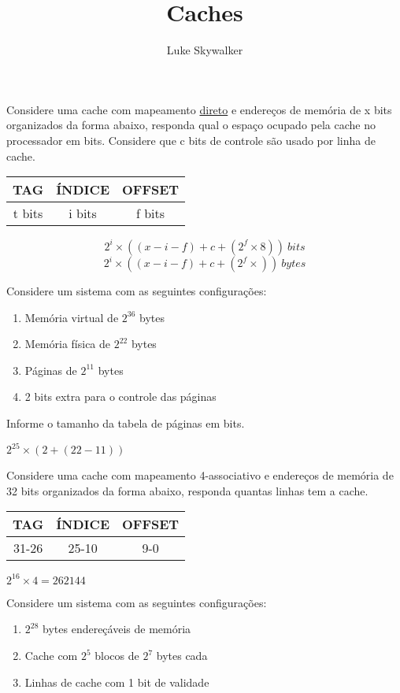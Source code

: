 \documentclass{article}
\author{Luke Skywalker}
\title{Caches}
\begin{document}
\maketitle

Considere uma cache com mapeamento \underline{direto} e endereços de memória de
x bits organizados da forma abaixo, responda qual o espaço ocupado pela cache no
processador em bits. Considere que c bits de controle são usado por linha de
cache.

\begin{table}[ht!]
  \centering
  \begin{tabular}{|c|c|c|}
    \hline TAG & ÍNDICE & OFFSET \\
    \hline t bits & i bits & f bits \\
    \hline
  \end{tabular}
\end{table}

$$2^{i}\times((x-i-f)+c+(2^{f} \times 8))\ bits$$
$$2^{i}\times((x-i-f)+c+(2^{f} \times))\ bytes$$

Considere um sistema com as seguintes configurações:

\begin{enumerate}
\item Memória virtual de $2^36$ bytes
\item Memória física de $2^22$ bytes
\item Páginas de $2^11$ bytes
\item 2 bits extra para o controle das páginas
\end{enumerate}

Informe o tamanho da tabela de páginas em bits.

$2^{25}\times(2+(22-11))$

Considere uma cache com mapeamento 4-associativo e endereços de memória de 32
bits organizados da forma abaixo, responda quantas linhas tem a cache.

\begin{tabular}{|c|c|c|}
\hline TAG & ÍNDICE & OFFSET \\
\hline 31-26 & 25-10 & 9-0 \\
\hline
\end{tabular}

$2^16 \times 4 = 262144$

Considere um sistema com as seguintes configurações:

\begin{enumerate}
\item $2^28$ bytes endereçáveis de memória
\item Cache com $2^5$ blocos de $2^7$ bytes cada
\item Linhas de cache com 1 bit de validade
\end{enumerate}
\end{document}
